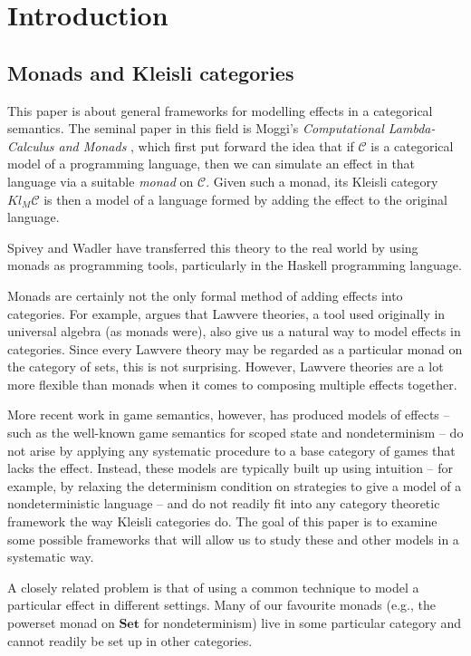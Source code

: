 \documentclass{svproc}
\newcommand\C{\mathcal{C}}
\newcommand{\0}{{\mathtt{0}}} \newcommand{\com}{{\mathtt{com}}}
\newcommand{\catname}[1]{\mathbf{#1}}
\newcommand{\Set}{\catname{Set}}
\begin{document}
\section{Introduction}

\subsection{Monads and Kleisli categories}

This paper is about general frameworks for modelling effects in a categorical semantics.  
The seminal paper in this field is Moggi's \emph{Computational Lambda-Calculus and Monads} \cite{Moggi}, which first put forward the idea that if $\C$ is a categorical model of a programming language, then we can simulate an effect in that language via a suitable \emph{monad} on $\C$.  
Given such a monad, its Kleisli category $Kl_M\C$ is then a model of a language formed by adding the effect to the original language.  

Spivey \cite{Spivey} and Wadler \cite{Wadler1,Wadler2} have transferred this theory to the real world by using monads as programming tools, particularly in the Haskell programming language.  

Monads are certainly not the only formal method of adding effects into categories.  
For example, \cite{Lawvere} argues that Lawvere theories, a tool used originally in universal algebra (as monads were), also give us a natural way to model effects in categories.  
Since \cite{FinitaryMonadOnSet} every Lawvere theory may be regarded as a particular monad on the category of sets, this is not surprising.  
However, Lawvere theories are a lot more flexible than monads when it comes to composing multiple effects together.

More recent work in game semantics, however, has produced models of effects -- such as the well-known game semantics for scoped state \cite{SamsonGuyIAPassive} and nondeterminism \cite{mcCHFiniteND} -- do not arise by applying any systematic procedure to a base category of games that lacks the effect.  
Instead, these models are typically built up using intuition -- for example, by relaxing the determinism condition on strategies to give a model of a nondeterministic language -- and do not readily fit into any category theoretic framework the way Kleisli categories do.  
The goal of this paper is to examine some possible frameworks that will allow us to study these and other models in a systematic way.  

A closely related problem is that of using a common technique to model a particular effect in different settings.  
Many of our favourite monads (e.g., the powerset monad on $\Set$ for nondeterminism) live in some particular category and cannot readily be set up in other categories. 
\end{document}
